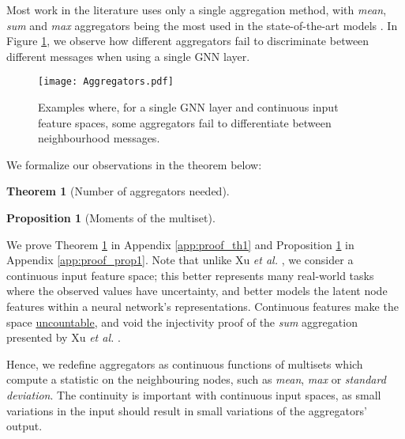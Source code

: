 \documentclass{article}
\newtheorem{theorem}{Theorem}
\newtheorem{proposition}{Proposition}
\begin{document}
Most work in the literature uses only a single aggregation method, with \textit{mean}, \textit{sum} and \textit{max} aggregators being the most used in the state-of-the-art models \cite{xu2018gin,kipf2016gcn,gilmer2017mpnn,velickovic2019neural}. In Figure \ref{fig:aggregators}, we observe how different aggregators fail to discriminate between different messages when using a single GNN layer.

\begin{figure}[h]
\centering
\texttt{[image: Aggregators.pdf]}
\caption{Examples where, for a single GNN layer and continuous input feature spaces, some aggregators fail to differentiate between neighbourhood messages.} \label{fig:aggregators}
\end{figure}

We formalize our observations in the theorem below:

\begin{theorem}[Number of aggregators needed]
    \label{theorem:1}
\end{theorem}

\begin{proposition}[Moments of the multiset]
    \label{proposition:1}
\end{proposition}


We prove Theorem \ref{theorem:1} in Appendix \ref{app:proof_th1} and Proposition \ref{proposition:1} in Appendix \ref{app:proof_prop1}. Note that unlike Xu \emph{et al.} \cite{xu2018gin}, we consider a continuous input feature space; this better represents many real-world tasks where the observed values have uncertainty, and better models the latent node features within a neural network's representations. Continuous features make the space \underline{uncountable}, and void the injectivity proof of the \textit{sum} aggregation presented by Xu \emph{et al.} \cite{xu2018gin}. 

Hence, we redefine aggregators as continuous functions of multisets which compute a statistic on the neighbouring nodes, such as \textit{mean}, \textit{max} or \textit{standard deviation}. The continuity is important with continuous input spaces, as small variations in the input should result in small variations of the aggregators' output.
\end{document}
